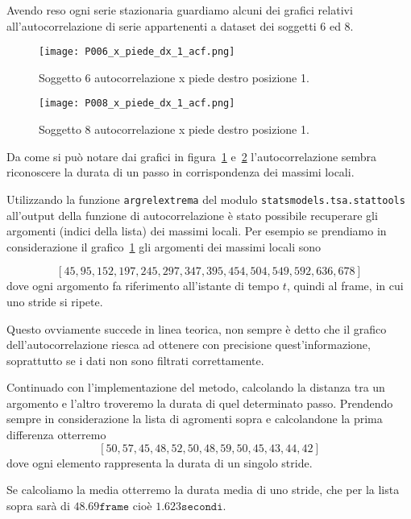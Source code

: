 \begin{sloppypar}
Avendo reso ogni serie stazionaria guardiamo alcuni dei grafici relativi all'autocorrelazione
di serie appartenenti a dataset dei soggetti $6$ ed $8$.
\end{sloppypar}

\begin{figure}[H]
    \centering
    \texttt{[image: P006\_x\_piede\_dx\_1\_acf.png]}
    \caption{Soggetto $6$ autocorrelazione x piede destro posizione 1.}
    \label{fig:P006_x_piede_dx_1_acf}
\end{figure}

\begin{figure}[H]
    \centering
    \texttt{[image: P008\_x\_piede\_dx\_1\_acf.png]}
    \caption{Soggetto $8$ autocorrelazione x piede destro posizione 1.}
    \label{fig:P008_x_piede_dx_1_acf}
\end{figure}

Da come si può notare dai grafici in figura~\ref{fig:P006_x_piede_dx_1_acf} e~\ref{fig:P008_x_piede_dx_1_acf}
l'autocorrelazione sembra riconoscere la durata di un passo in corrispondenza dei massimi locali.
\begin{sloppypar}
Utilizzando la funzione \texttt{argrelextrema} del modulo \texttt{statsmodels.tsa.stattools}
all'output della funzione di autocorrelazione è stato possibile recuperare gli argomenti (indici della lista) dei massimi locali.
Per esempio se prendiamo in considerazione il grafico~\ref{fig:P006_x_piede_dx_1_acf} gli argomenti
dei massimi locali sono
\end{sloppypar}
\[ [45, 95, 152, 197, 245, 297, 347, 395, 454, 504, 549, 592, 636, 678] \]
dove ogni argomento fa riferimento all'istante di tempo $t$, quindi al frame, in cui uno stride si ripete.

Questo ovviamente succede in linea teorica, non sempre è detto che il grafico dell'autocorrelazione
riesca ad ottenere con precisione quest'informazione, soprattutto se i dati non sono filtrati correttamente.

Continuado con l'implementazione del metodo, calcolando la distanza tra un argomento e l'altro troveremo
la durata di quel determinato passo. Prendendo sempre in considerazione la lista di agromenti sopra
e calcolandone la prima differenza otterremo
\[[50, 57, 45, 48, 52, 50, 48, 59, 50, 45, 43, 44, 42]\]
dove ogni elemento rappresenta la durata di un singolo stride.

Se calcoliamo la media otterremo la durata media di uno stride, che per la lista sopra sarà di 
$48.69\texttt{frame}$ cioè $1.623\texttt{secondi}$.


